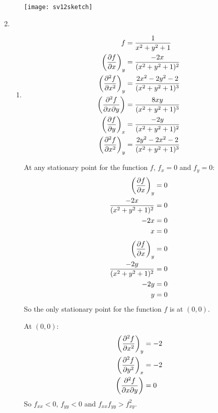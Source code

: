 \documentclass[10pt,\jkfside,a4paper]{article}
\begin{document}
\begin{enumerate}
\begin{enumerate}
\begin{center}
\texttt{[image: sv12sketch]}
\end{center}

\end{enumerate}

\item
\begin{enumerate}

\item 
\begin{equation}
\begin{split}
f &= \frac{1}{x^{2} + y^{2} + 1} \\
\left(\pdv{f}{x}\right)_y &= \frac{-2x}{(x^{2} + y^{2} + 1)^2} \\
\left(\pdv[2]{f}{x}\right)_y &= \frac{2x^{2} - 2y^{2} - 2}{(x^{2} + y^{2} + 1)^3} \\
\left(\pdv[2]{f}{x}{y}\right) &= \frac{8xy}{(x^{2} + y^{2} + 1)^3} \\
\left(\pdv{f}{y}\right)_x &= \frac{-2y}{(x^{2} + y^{2} + 1)^2} \\
\left(\pdv[2]{f}{x}\right)_y &= \frac{2y^{2} - 2x^{2} - 2}{(x^{2} + y^{2} + 1)^3} \\
\end{split}
\end{equation}

At any stationary point for the function $f$, $f_x = 0$ and $f_y = 0$:
\begin{equation}
\begin{split}
\left(\pdv{f}{x}\right)_y &= 0 \\
\frac{-2x}{(x^{2} + y^{2} + 1)^2} &= 0 \\
-2x &= 0 \\
x &= 0 \\
\end{split}
\end{equation}
\begin{equation}
\begin{split}
\left(\pdv{f}{x}\right)_y &= 0 \\
\frac{-2y}{(x^{2} + y^{2} + 1)^2} &= 0 \\
-2y &= 0 \\
y &= 0 \\
\end{split}
\end{equation}
So the only stationary point for the function $f$ is at $(0, 0)$.

At $(0, 0)$:
\begin{equation}
\begin{split}
\left(\pdv[2]{f}{x}\right)_y &= -2 \\
\left(\pdv[2]{f}{y}\right)_x &= -2 \\
\left(\pdv[2]{f}{x}{y}\right) &= 0 \\
\end{split}
\end{equation}
So $f_{xx} < 0$, $f_{yy} < 0$ and $f_{xx}f_{yy} > f^2_{xy}$.


\end{enumerate}
\end{enumerate}
\end{document}
